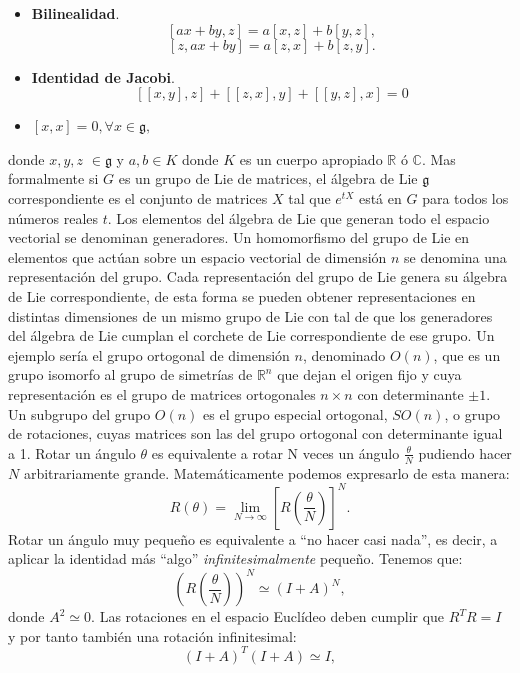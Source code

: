 \documentclass{article}
\theoremstyle{plain}
\theoremstyle{definition}
\begin{document}
	\begin{itemize}
		\item \textbf{Bilinealidad}.
		\[\left[ax+by,z\right] = a\left[x,z\right] + b\left[y,z\right], \]   \[\left[z, ax+by\right] = a\left[z,x\right] + b\left[z,y\right]\text{.} \]
		\item \textbf{Identidad de Jacobi}.
		\[\left[\left[x,y\right],z\right] + \left[\left[z,x\right],y\right] + \left[\left[y,z\right],x\right] = 0\]
		\item \(\left[x,x\right] = 0, \forall x \in \mathfrak{g}, \)
	\end{itemize}
	donde \(x,y,z\) \(\in \mathfrak{g}\) y  \(a,b \in K\) donde \(K\) es un cuerpo apropiado \(\mathbb{R}\) ó \(\mathbb{C}\). Mas formalmente si \(G\) es un grupo de Lie de matrices, el álgebra de Lie \(\mathfrak{g} \) correspondiente es el conjunto de matrices \(X\) tal que \(e^{tX}\) está en \(G\) para todos los números reales \(t\). Los elementos del álgebra de Lie que generan todo el espacio vectorial se denominan generadores. Un homomorfismo del grupo de Lie en elementos que actúan sobre un espacio vectorial de dimensión \(n\) se denomina una representación del grupo. Cada representación del grupo de Lie genera su álgebra de Lie correspondiente, de esta forma se pueden obtener representaciones en distintas dimensiones de un mismo grupo de Lie con tal de que los generadores del álgebra de Lie cumplan el corchete de Lie correspondiente de ese grupo. \newline 
	Un ejemplo sería el grupo ortogonal de dimensión \(n\), denominado \(O(n)\), que es un grupo isomorfo al grupo de simetrías de \(\mathbb{R}^n\) que dejan el origen fijo y cuya representación es el grupo de matrices ortogonales \(n\times n\) con determinante \(\pm 1 \). Un subgrupo del grupo \(O(n)\) es el grupo especial ortogonal, \(SO(n)\), o grupo de rotaciones, cuyas matrices son las del grupo ortogonal con determinante igual a 1. Rotar un ángulo \(\theta\)   es equivalente a rotar N veces un ángulo \(\frac{\theta}{N}\) pudiendo hacer \(N\) arbitrariamente grande. Matemáticamente podemos expresarlo de esta manera:
	\[R(\theta) = \lim\limits_{N\rightarrow\infty}\left[R\left(\frac{\theta}{N}\right)\right]^N \text{.} \]
	Rotar un ángulo muy pequeño es equivalente a ``no hacer casi nada'', es decir, a aplicar la identidad más ``algo'' \textit{infinitesimalmente} pequeño. Tenemos que:
	\[\left(R(\frac{\theta}{N})\right)^N  \simeq (I + A)^N, \] donde \(A^2 \simeq 0\). Las rotaciones en el espacio Euclídeo deben cumplir que \(R^TR = I\) y por tanto también una rotación infinitesimal: \[(I+A)^T(I+A) \simeq I,\]
\end{document}
